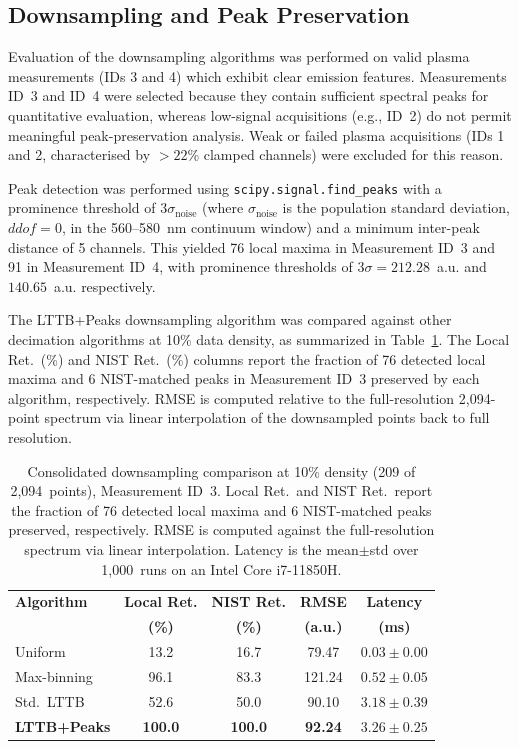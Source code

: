 \documentclass[final,5p,twocolumn,a4paper]{elsarticle}
\begin{document}
\subsection{Downsampling and Peak Preservation}

Evaluation of the downsampling algorithms was performed on valid plasma measurements (IDs 3 and 4) which exhibit clear emission features. Measurements ID~3 and ID~4 were selected because they contain sufficient spectral peaks for quantitative evaluation, whereas low-signal acquisitions (e.g., ID~2) do not permit meaningful peak-preservation analysis. Weak or failed plasma acquisitions (IDs 1 and 2, characterised by $>22$\% clamped channels) were excluded for this reason.

Peak detection was performed using \texttt{scipy.signal.find\_peaks} with a prominence threshold of $3\sigma_{\text{noise}}$ (where $\sigma_{\text{noise}}$ is the population standard deviation, $\mathit{ddof}{=}0$, in the 560--580~nm continuum window) and a minimum inter-peak distance of 5 channels. This yielded 76 local maxima in Measurement ID~3 and 91 in Measurement ID~4, with prominence thresholds of $3\sigma = 212.28$~a.u. and $140.65$~a.u. respectively.

The LTTB+Peaks downsampling algorithm was compared against other decimation algorithms at 10\% data density, as summarized in Table~\ref{table:downsampling}. The Local Ret.\ (\%) and NIST Ret.\ (\%) columns report the fraction of 76 detected local maxima and 6 NIST-matched peaks in Measurement ID~3 preserved by each algorithm, respectively. RMSE is computed relative to the full-resolution 2,094-point spectrum via linear interpolation of the downsampled points back to full resolution.

\begin{table}[!htbp]
\centering
\footnotesize
\setlength{\tabcolsep}{3pt}
\begin{tabular}{@{}p{1.8cm}cccc@{}}
\toprule
\textbf{Algorithm} & \textbf{Local Ret.} & \textbf{NIST Ret.} & \textbf{RMSE} & \textbf{Latency} \\
 & \textbf{(\%)} & \textbf{(\%)} & \textbf{(a.u.)} & \textbf{(ms)} \\
\midrule
Uniform      & 13.2  & 16.7  & 79.47  & $0.03{\pm}0.00$ \\
Max-binning  & 96.1  & 83.3  & 121.24 & $0.52{\pm}0.05$ \\
Std.\ LTTB   & 52.6  & 50.0  & 90.10  & $3.18{\pm}0.39$ \\
\textbf{LTTB+Peaks} & \textbf{100.0} & \textbf{100.0} & \textbf{92.24} & $\mathbf{3.26{\pm}0.25}$ \\
\bottomrule
\end{tabular}
\caption{Consolidated downsampling comparison at 10\% density (209 of 2,094~points), Measurement ID~3. Local Ret.\ and NIST Ret.\ report the fraction of 76 detected local maxima and 6 NIST-matched peaks preserved, respectively. RMSE is computed against the full-resolution spectrum via linear interpolation. Latency is the mean$\pm$std over 1,000~runs on an Intel Core i7-11850H.}
\label{table:downsampling}
\end{table}
\end{document}
